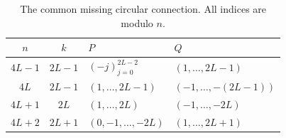 \documentclass[11pt]{article}
\theoremstyle{definition}
\begin{document}
\begin{table}[htbp]
\centering
\begin{tabular}{@{}ccll@{}}
\toprule
\(n\) & \(k\) & \(P\) & \(Q\)\\
\midrule
\(4L-1\) & \(2L-1\) & \((-j)_{j=0}^{2L-2}\) &
 \((1,\ldots,2L-1)\)\\
\(4L\) & \(2L-1\) & \((1,\ldots,2L-1)\) &
 \((-1,\ldots,-(2L-1))\)\\
\(4L+1\) & \(2L\) & \((1,\ldots,2L)\) &
 \((-1,\ldots,-2L)\)\\
\(4L+2\) & \(2L+1\) & \((0,-1,\ldots,-2L)\) &
 \((1,\ldots,2L+1)\)\\
\bottomrule
\end{tabular}
\caption{The common missing circular connection. All indices are modulo \(n\).}
\label{tab:minor}
\end{table}
\end{document}
